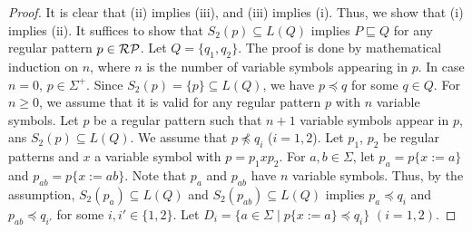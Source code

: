 \begin{proof}
    It is clear that (ii) implies (iii), and (iii) implies (i).
    Thus, we show that (i) implies (ii).
    It suffices to show that $S_{2}(p) \subseteq L(Q)$ implies $P \sqsubseteq Q$
    for any regular pattern $p \in \mathcal{RP}$.
    Let $Q = \{q_{1}, q_{2}\}$.
    The proof is done by mathematical induction on $n$,
    where $n$ is the number of variable symbols appearing in $p$.
    In case $n=0$, $p \in \Sigma^{+}$.
    Since $S_{2}(p) = \{p\} \subseteq L(Q)$, we have $p \preceq q$
    for some $q \in Q$.
    For $n \geq 0$, we assume that it is valid for any regular pattern $p$ with
    $n$ variable symbols.
    Let $p$ be a regular pattern such that $n+1$ variable symbols appear in $p$,
    ans $S_{2}(p) \subseteq L(Q)$.
    We assume that $p \not\preceq q_{i}$ ($i=1,2$).
    Let $p_{1}$, $p_{2}$ be regular patterns and $x$ a variable symbol
    with $p = p_{1}xp_{2}$.
    For $a, b \in \Sigma$,
    let $p_{a} = p\{x:=a\}$ and $p_{ab} = p\{x:=ab\}$.
    Note that $p_{a}$ and $p_{ab}$ have $n$ variable symbols.
    Thus, by the assumption,
    $S_{2}(p_{a}) \subseteq L(Q)$ and $S_{2}(p_{ab}) \subseteq L(Q)$
    implies $p_{a} \preceq q_{i}$ and $p_{ab} \preceq q_{i'}$ for some
    $i, i' \in \{1,2\}$.
    Let $D_{i} = \{a \in \Sigma \mid p\{x:=a\} \preceq q_{i}\}$ $(i=1,2)$.

\end{proof}
